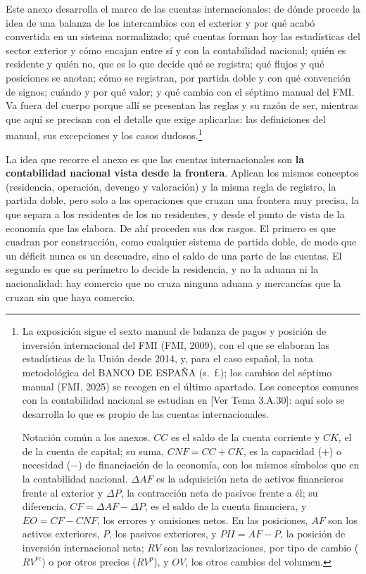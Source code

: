 \documentclass[10pt,a4paper]{article}
\newcommand{\authorfont}[1]{{\fontfamily{EBGaramond-TLF}\selectfont #1}}
\newcounter{anexo}
\begin{document}
Este anexo desarrolla el marco de las cuentas internacionales: de dónde procede la idea de una balanza de los intercambios con el exterior y por qué acabó convertida en un sistema normalizado; qué cuentas forman hoy las estadísticas del sector exterior y cómo encajan entre sí y con la contabilidad nacional; quién es residente y quién no, que es lo que decide qué se registra; qué flujos y qué posiciones se anotan; cómo se registran, por partida doble y con qué convención de signos; cuándo y por qué valor; y qué cambia con el séptimo manual del FMI. Va fuera del cuerpo porque allí se presentan las reglas y su razón de ser, mientras que aquí se precisan con el detalle que exige aplicarlas: las definiciones del manual, sus excepciones y los casos dudosos.\footnote{%
    La exposición sigue el sexto manual de balanza de pagos y posición de inversión internacional del FMI (FMI, 2009), con el que se elaboran las estadísticas de la Unión desde 2014, y, para el caso español, la nota metodológica del BANCO DE ESPAÑA (s.~f.); los cambios del séptimo manual (FMI, 2025) se recogen en el último apartado. Los conceptos comunes con la contabilidad nacional se estudian en [\authorfont{Ver Tema 3.A.30}]: aquí solo se desarrolla lo que es propio de las cuentas internacionales.

    Notación común a los anexos. $CC$ es el saldo de la cuenta corriente y $CK$, el de la cuenta de capital; su suma, $CNF=CC+CK$, es la capacidad ($+$) o necesidad ($-$) de financiación de la economía, con los mismos símbolos que en la contabilidad nacional. $\Delta AF$ es la adquisición neta de activos financieros frente al exterior y $\Delta P$, la contracción neta de pasivos frente a él; su diferencia, $CF=\Delta AF-\Delta P$, es el saldo de la cuenta financiera, y $EO=CF-CNF$, los errores y omisiones netos. En las posiciones, $AF$ son los activos exteriores, $P$, los pasivos exteriores, y $PII=AF-P$, la posición de inversión internacional neta; $RV$ son las revalorizaciones, por tipo de cambio ($RV^{tc}$) o por otros precios ($RV^{p}$), y $OV$, los otros cambios del volumen.
}

La idea que recorre el anexo es que las cuentas internacionales son \textbf{la contabilidad nacional vista desde la frontera}. Aplican los mismos conceptos (residencia, operación, devengo y valoración) y la misma regla de registro, la partida doble, pero solo a las operaciones que cruzan una frontera muy precisa, la que separa a los residentes de los no residentes, y desde el punto de vista de la economía que las elabora. De ahí proceden sus dos rasgos. El primero es que cuadran por construcción, como cualquier sistema de partida doble, de modo que un déficit nunca es un descuadre, sino el saldo de una parte de las cuentas. El segundo es que su perímetro lo decide la residencia, y no la aduana ni la nacionalidad: hay comercio que no cruza ninguna aduana y mercancías que la cruzan sin que haya comercio.
\end{document}
